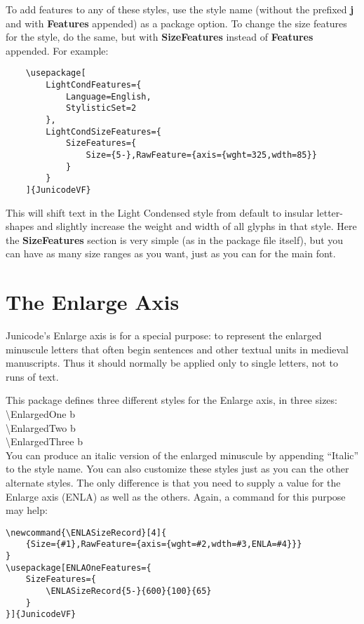 \documentclass[12pt]{article}
\begin{document}
To add features to any of these styles, use the style name
(without the prefixed \textbf{j} and with \textbf{Features} appended)
as a package option. To change the size features for the style,
do the same, but with \textbf{SizeFeatures} instead of \textbf{Features}
appended. For example:

\footnotesize
\begin{verbatim}
    \usepackage[
        LightCondFeatures={
            Language=English,
            StylisticSet=2
        },
        LightCondSizeFeatures={
            SizeFeatures={
                Size={5-},RawFeature={axis={wght=325,wdth=85}}
            }
        }
    ]{JunicodeVF}
\end{verbatim}
\normalsize

\noindent This will shift text in the Light Condensed style from default to insular
letter-shapes and slightly increase the weight and width of all glyphs in that style.
Here the \textbf{SizeFeatures} section is very simple (as in the package file itself),
but you can have as many size ranges as you want, just as you can for the main font.

\section{The Enlarge Axis}

Junicode's Enlarge axis is for a special purpose: to represent the enlarged
minuscule letters that often begin sentences and other textual units in medieval manuscripts.
Thus it should normally be applied only to single letters, not to runs of text.

This package defines three different styles for the Enlarge axis, in three sizes:\\[0.5ex]

\noindent\textbackslash EnlargedOne {\EnlargedOne b}\\
\textbackslash EnlargedTwo {\EnlargedTwo b}\\
\textbackslash EnlargedThree {\EnlargedThree b}\\[0.5ex]

\noindent You can produce an italic version of the enlarged minuscule by appending “Italic” to
the style name. You can also customize these styles just as you can the other alternate
styles. The only difference is that you need to supply a value for the Enlarge axis (ENLA)
as well as the others. Again, a command for this purpose may help:

\footnotesize
\begin{verbatim}
\newcommand{\ENLASizeRecord}[4]{
    {Size={#1},RawFeature={axis={wght=#2,wdth=#3,ENLA=#4}}}
}
\usepackage[ENLAOneFeatures={
    SizeFeatures={
        \ENLASizeRecord{5-}{600}{100}{65}
    }
}]{JunicodeVF}
\end{verbatim}
\normalsize
\end{document}
